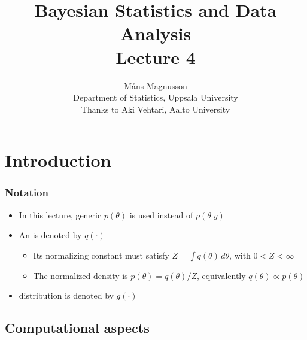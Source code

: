 \documentclass[10pt]{beamer}
\title[]{{\color{black}Bayesian Statistics and Data Analysis \\ Lecture 4}}
\author[]{M{\aa}ns Magnusson \\ Department of Statistics, Uppsala University \\ Thanks to Aki Vehtari, Aalto University}
\date{}
\begin{document}
\frame{\titlepage
}





\section{Introduction}

\begin{frame}

\frametitle{Notation}

  \begin{itemize}
  \item In this lecture, generic $p(\theta)$ is used instead of
    $p(\theta|y)$
    \pause
  \item An  is denoted by $q(\cdot)$
    \begin{itemize}
    \item Its normalizing constant must satisfy
      $Z=\int q(\theta)\,d\theta$, with $0<Z<\infty$
    \item The normalized density is
      $p(\theta)=q(\theta)/Z$, equivalently $q(\theta)\propto p(\theta)$
    \end{itemize}
    \pause
  \item {} distribution is denoted by $g(\cdot)$
  \end{itemize}

\end{frame}

\subsection{Computational aspects}
\end{document}
